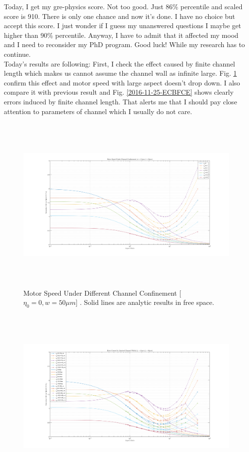 \documentclass[fontsize=11pt, %
                             paper=a4, %
                             twoside, %
                             captions=tableheading,
                             index=totoc,
                             hyperref]{labbook}
\begin{document}
\begin{addmargin}[4cm]{0cm}
Today, I get my gre-physics score. Not too good. Just 86\% percentile and scaled score is 910. There is only one chance and now it's done. I have no choice but accept this score. I just wonder if I guess my unanswered questions I maybe get higher than 90\% percentile. Anyway, I have to admit that it affected my mood and I need to reconsider my PhD program. Good luck! While my research has to continue.\\

Today's results are following:
First, I check the effect caused by finite channel length which makes us cannot assume the channel wall as infinite large. Fig. \ref{2016-11-25-MSUDCC} confirm this effect and motor speed with large aspect doesn't drop down. I also compare it with previous result and Fig. \ref{2016-11-25-ECBFCE} shows clearly errors induced by finite channel length. That alerts me that I should pay close attention to parameters of channel which I usually do not care.
\begin{figure}
\centering
\includegraphics[width=\linewidth, height=3.5in]{2016-11-25-AnalyticVerification_Channel_New.png}
\caption{Motor Speed Under Different Channel Confinement [$\eta_0=0, w=50\mu m$] . Solid lines are analytic results in free space.}\label{2016-11-25-MSUDCC}
\end{figure}
\begin{figure}
\centering
\includegraphics[width=\linewidth, height=3.5in]{2016-11-25-AnalyticVerification_Finite_Channel_Effect.png}

\end{figure}
\end{addmargin}
\end{document}
